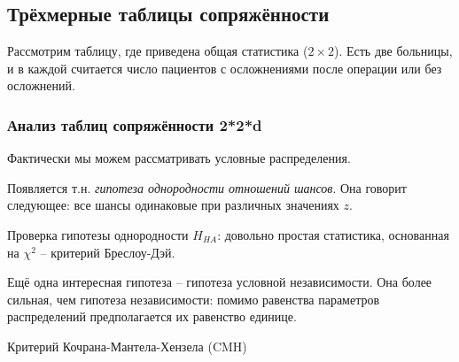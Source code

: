 \documentclass[main.tex]{subfiles}
\begin{document}

\subsection{Трёхмерные таблицы сопряжённости}

Рассмотрим таблицу, где приведена общая статистика ($ 2 \times 2$).
Есть две больницы, и в каждой считается число пациентов с осложнениями после операции или без осложнений.


\subsubsection{Анализ таблиц сопряжённости 2*2*d}

Фактически мы можем рассматривать условные распределения.

Появляется т.н. \emph{гипотеза однородности отношений шансов}.
Она говорит следующее: все шансы одинаковые при различных значениях $z$.


Проверка гипотезы однородности $ H_{HA} $: довольно простая статистика, основанная на $ \chi^2 $ -- критерий Бреслоу-Дэй.

Ещё одна интересная гипотеза -- гипотеза условной независимости.
Она более сильная, чем гипотеза независимости: помимо равенства параметров распределений предполагается их равенство единице.

Критерий Кочрана-Мантела-Хензела (CMH)
\end{document}
